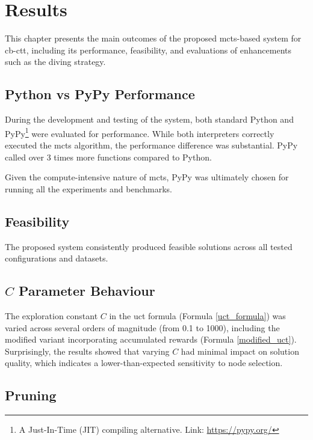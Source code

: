\chapter{Results}

\label{Results}

This chapter presents the main outcomes of the proposed \ac{mcts}-based system for \ac{cb-ctt}, including its performance, feasibility, and evaluations of enhancements such as the diving strategy.

\section{Python vs PyPy Performance}

During the development and testing of the system, both standard Python and PyPy\footnote{A Just-In-Time (JIT) compiling alternative. Link: \url{https://pypy.org/}} were evaluated for performance. While both interpreters correctly executed the \ac{mcts} algorithm, the performance difference was substantial. PyPy called over 3 times more functions compared to Python.

Given the compute-intensive nature of \ac{mcts}, PyPy was ultimately chosen for running all the experiments and benchmarks.

\section{Feasibility}

The proposed system consistently produced feasible solutions across all tested configurations and datasets.

\section{\(C\) Parameter Behaviour}

The exploration constant \(C\) in the \ac{uct} formula (Formula \ref{uct_formula}) was varied across several orders of magnitude (from 0.1 to 1000), including the modified variant incorporating accumulated rewards (Formula \ref{modified_uct}). Surprisingly, the results showed that varying \(C\) had minimal impact on solution quality, which indicates a lower-than-expected sensitivity to node selection.

\section{Pruning}


